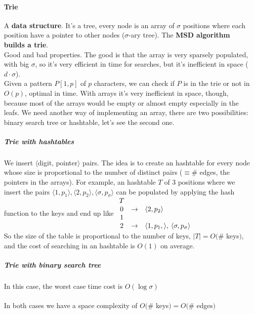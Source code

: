 \documentclass[10pt]{report}
\begin{document}
\paragraph{Trie} A \textbf{data structure}. It's a tree, every node is an array of $\sigma$ positions where each position have a pointer to other nodes ($\sigma$-ary tree). The \textbf{MSD algorithm builds a trie}.\\
Good and bad properties. The good is that the array is very sparsely populated, with big $\sigma$, so it's very efficient in time for searches, but it's inefficient in space ($d\cdot\sigma$).\\
Given a pattern $P[1,p]$ of $p$ characters, we can check if $P$ is in the trie or not in $O(p)$, optimal in time. With arrays it's very inefficient in space, though, because most of the arrays would be empty or almost empty especially in the leafs. We need another way of implementing an array, there are two possibilities: binary search tree or hashtable, let's see the second one.
\subparagraph{Trie with hashtables} We insert $\langle$digit, pointer$\rangle$ pairs. The idea is to create an hashtable for every node whose size is proportional to the number of distinct pairs ($\equiv\#$ edges, the pointers in the arrays). For example, an hashtable $T$ of $3$ positions where we insert the pairs $\langle 1,p_1\rangle, \langle 2,p_2\rangle, \langle \sigma,p_\sigma\rangle$ can be populated by applying the hash function to the keys and end up like $\begin{array}{c c l}
T\\
0&\rightarrow&\langle 2,p_2\rangle\\
1\\
2&\rightarrow&\langle 1,p_1,\rangle,\:\langle \sigma, p_\sigma\rangle
\end{array}$\\
So the size of the table is proportional to the number of keys, $|T|=O(\#$ keys$)$, and the cost of searching in an hashtable is $O(1)$ on average.
\subparagraph{Trie with binary search tree} In this case, the worst case time cost is $O(\log \sigma)$\\\\
In both cases we have a space complexity of $O(\#$ keys$)=O(\#$ edges$)$
\end{document}
